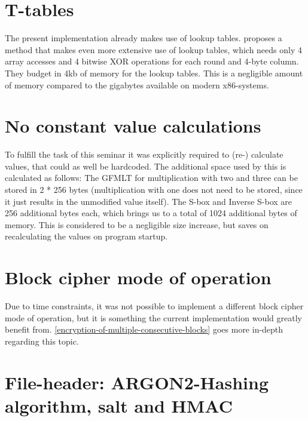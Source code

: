 \hypertarget{t-tables}{%
\section{T-tables}\label{t-tables}}

The present implementation already makes use of lookup tables. \cite[p. 59]{rijndael} proposes a method that makes even more extensive use of lookup
tables, which needs only 4 array accesses and 4 bitwise \ac{XOR} operations
for each round and 4-byte column. They budget in 4kb of memory for the
lookup tables. This is a negligible amount of memory compared to the
gigabytes available on modern \ac{x86}-systems.

\hypertarget{no-constant-value-calculations}{%
\section{No constant value
calculations}\label{no-constant-value-calculations}}

To fulfill the task of this seminar it was explicitly required to (re-)
calculate values, that could as well be hardcoded. The additional space
used by this is calculated as follows: The \ac{GFMLT} for multiplication with
two and three can be stored in 2 * 256 bytes (multiplication with one
does not need to be stored, since it just results in the unmodified
value itself). The S-box and Inverse S-box are 256 additional bytes
each, which brings us to a total of 1024 additional bytes of memory.
This is considered to be a negligible size increase, but saves on
recalculating the values on program startup.

\hypertarget{block-cipher-mode-of-operation}{%
\section{Block cipher mode of
operation}\label{block-cipher-mode-of-operation}}

Due to time constraints, it was not possible to implement a different
block cipher mode of operation, but it is something the current
implementation would greatly benefit from. \ref{encryption-of-multiple-consecutive-blocks} goes more
in-depth regarding this topic.

\hypertarget{file-header-argon2-hashing-algorithm-salt-and-hmac}{%
\section{File-header: ARGON2-Hashing algorithm, salt and
HMAC}\label{file-header-argon2-hashing-algorithm-salt-and-hmac}}

